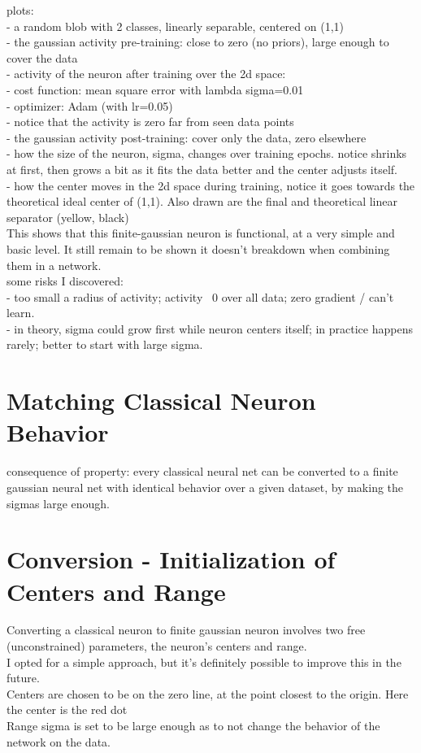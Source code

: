 \documentclass{article}
\begin{document}
plots: \\ 
 - a random blob with 2 classes, linearly separable, centered on (1,1)\\
 - the gaussian activity pre-training: close to zero (no priors), large enough to cover the data\\
 - activity of the neuron after training over the 2d space: \\
    - cost function: mean square error with lambda sigma=0.01\\
    - optimizer: Adam (with lr=0.05)\\
    - notice that the activity is zero far from seen data points \\ 
 -  the gaussian activity post-training: cover only the data, zero elsewhere\\
 - how the size of the neuron, sigma, changes over training epochs. notice shrinks at first, then grows a bit as it fits the data better and the center adjusts itself.\\
 - how the center moves in the 2d space during training, notice it goes towards the theoretical ideal center of (1,1). Also drawn are the final and theoretical linear separator (yellow, black)\\
 
 This shows that this finite-gaussian neuron is functional, at a very simple and basic level. It still remain to be shown it doesn't breakdown when combining them in a network.\\
    
some risks I discovered:\\
 - too small a radius of activity; activity ~0 over all data; zero gradient / can't learn. \\ 
 - in theory, sigma could grow first while neuron centers itself; in practice happens rarely; better to start with large sigma. \\ 

\section{Matching Classical Neuron Behavior}
consequence of property:  every classical neural net can be converted to a finite gaussian neural net with identical behavior over a given dataset, by making the sigmas large enough.

\section{Conversion - Initialization of Centers and Range}
Converting a classical neuron to finite gaussian neuron involves two free (unconstrained) parameters, the neuron's centers and range.\\
I opted for a simple approach, but it's definitely possible to improve this in the future.\\
Centers are chosen to be on the zero line, at the point closest to the origin. Here the center is the red dot\\
Range sigma is set to be large enough as to not change the behavior of the network on the data. 
\end{document}
